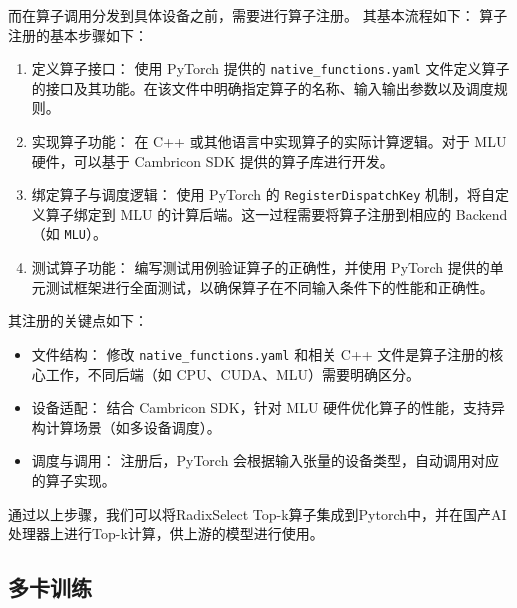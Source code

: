 而在算子调用分发到具体设备之前，需要进行算子注册。
其基本流程如下：
算子注册的基本步骤如下：
\begin{enumerate}
    \item {定义算子接口}：
    使用 PyTorch 提供的 \texttt{native\_functions.yaml} 文件定义算子的接口及其功能。在该文件中明确指定算子的名称、输入输出参数以及调度规则。
    
    \item {实现算子功能}：
    在 C++ 或其他语言中实现算子的实际计算逻辑。对于 MLU 硬件，可以基于 Cambricon SDK 提供的算子库进行开发。
    
    \item {绑定算子与调度逻辑}：
    使用 PyTorch 的 \texttt{RegisterDispatchKey} 机制，将自定义算子绑定到 MLU 的计算后端。这一过程需要将算子注册到相应的 Backend（如 \texttt{MLU}）。
    
    \item {测试算子功能}：
    编写测试用例验证算子的正确性，并使用 PyTorch 提供的单元测试框架进行全面测试，以确保算子在不同输入条件下的性能和正确性。
\end{enumerate}
其注册的关键点如下：
\begin{itemize}
    \item {文件结构}：
    修改 \texttt{native\_functions.yaml} 和相关 C++ 文件是算子注册的核心工作，不同后端（如 CPU、CUDA、MLU）需要明确区分。
    
    \item {设备适配}：
    结合 {Cambricon SDK}，针对 MLU 硬件优化算子的性能，支持异构计算场景（如多设备调度）。
    
    \item {调度与调用}：
    注册后，PyTorch 会根据输入张量的设备类型，自动调用对应的算子实现。
\end{itemize}

通过以上步骤，我们可以将RadixSelect Top-k算子集成到Pytorch中，并在国产AI处理器上进行Top-k计算，供上游的模型进行使用。



\subsection{多卡训练}




